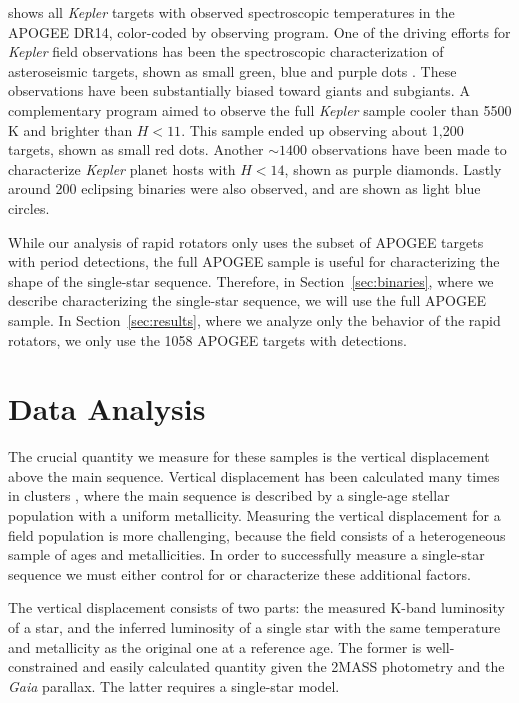 \documentclass[manuscript]{aastex6}
\newcommand{\Kepler}{\mbox{\textit{Kepler}}}
\newcommand{\Gaia}{\mbox{\textit{Gaia}}}
\newcommand{\gvs}{\authorcomment1}
\begin{document}
 shows all \Kepler{} targets with observed
spectroscopic temperatures in the APOGEE DR14, color-coded by observing
program. One of the driving efforts for \Kepler{} field observations has been
the spectroscopic characterization of asteroseismic targets, shown as small
green, blue and purple dots \citep{Zasowski17,Pinsonneault18}. These
observations have been substantially biased toward giants and subgiants. A
complementary program aimed to observe the full \Kepler{} sample cooler than
5500 K and brighter than \(H < 11\). This sample ended up observing about 1,200
targets, shown as small red dots. Another \(\sim 1400\) observations have been
made to characterize \Kepler{} planet hosts with \(H < 14\), shown as purple
diamonds. Lastly around 200 eclipsing binaries \citep{Prsa11,Slawson11} were
also observed, and are shown as light blue circles.

While our analysis of rapid rotators only uses the subset of APOGEE targets
with period detections, the full APOGEE sample is useful for characterizing the
shape of the single-star sequence. Therefore, in Section~\ref{sec:binaries},
where we describe characterizing the single-star sequence, we will use the full
APOGEE sample. In Section~\ref{sec:results}, where we analyze only the behavior
of the rapid rotators, we only use the 1058 APOGEE targets with
\citet{McQuillan14} detections.

\section{Data Analysis}
\label{sec:analysis}

\gvs{Under Construction}

The crucial quantity we measure for these samples is the vertical displacement
above the main sequence. Vertical displacement has been calculated many times
in clusters \citep{Mermillod92}, where the main sequence is described by a
single-age stellar population with a uniform metallicity. Measuring the
vertical displacement for a field population is more challenging, because the
field consists of a heterogeneous sample of ages and metallicities. In order to
successfully measure a single-star sequence we must either control for or
characterize these additional factors. 

The vertical displacement consists of two parts: the measured K-band
luminosity of a star, and the inferred luminosity of a single star with the
same temperature and metallicity as the original one at a reference age. The 
former is well-constrained and easily calculated quantity given the 2MASS 
photometry and the \Gaia{} parallax. The latter requires a single-star model.
\end{document}
